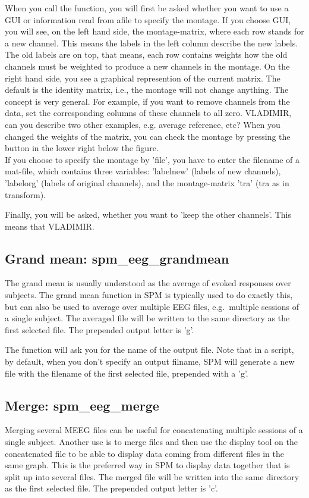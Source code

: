 When you call the function, you will first be asked whether you want to use a GUI or information read from afile to specify the montage. If you choose GUI, you will see, on the left hand side, the montage-matrix, where each row stands for a new channel. This means the labels in the left column describe the new labels. The old labels are on top, that means, each row contains weights how the old channels must be weighted to produce a new channels in the montage. On the right hand side, you see a graphical represention of the current matrix. The default is the identity matrix, i.e., the montage will not change anything. The concept is very general. For example, if you want to remove channels from the data, set the corresponding columns of these channels to all zero. VLADIMIR, can you describe two other examples, e.g. average reference, etc? When you changed the weights of the matrix, you can check the montage by pressing the button in the lower right below the figure.
\\
If you choose to specify the montage by 'file', you have to enter the filename of a mat-file, which contains three variables: 'labelnew' (labels of new channels), 'labelorg' (labels of original channels), and the montage-matrix 'tra' (tra as in transform).

Finally, you will be asked, whether you want to 'keep the other channels'. This means that VLADIMIR.


\subsection{Grand mean: spm\_eeg\_grandmean}
The grand mean is usually understood as the average of evoked
responses over subjects. The grand mean function in SPM is typically
used to do exactly this, but can also be used to average over multiple 
EEG files, e.g.~multiple sessions of a single subject. The averaged
file will be written to the same directory as the first selected
file. The prepended output letter is 'g'.

The function will ask you for the name of the output file. Note that in a script, by default, when you don't specify an output filname, SPM will generate a new file with the filename of the first selected file, prepended with a 'g'.

\subsection{Merge: spm\_eeg\_merge}
Merging several MEEG files can be useful for concatenating multiple
sessions of a single subject. Another use is to merge files and then
use the display tool on the concatenated file to be able to display
data coming from different files in the same graph. This is the
preferred way in SPM to display data together that is split up into
several files. The merged file will be written into the same directory
as the first selected file. The prepended output letter is 'c'.

